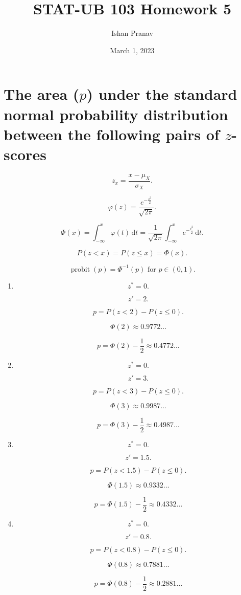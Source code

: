 \documentclass[12pt]{article}
\title{STAT-UB 103 Homework 5}
\author{Ishan Pranav}
\date{March 1, 2023}
\DeclareMathOperator{\probit}{probit}
\begin{document}
\maketitle
\section{The area ($p$) under the standard normal probability distribution between the following pairs of $z$-scores}
\[z_x=\frac{x-\mu_X}{\sigma_X}.\]

\[\varphi(z)=\frac{e^{-\frac{z^2}{2}}}{\sqrt{2\pi}}.\]

\[\Phi(x)=\int^x_{-\infty}{\varphi(t)\,\mathrm{d}t}=\frac{1}{\sqrt{2\pi}}\int^x_{-\infty}{e^{-\frac{t^2}{2}}\,\mathrm{d}t}.\]

\[P(z<x)=P(z\leq x)=\Phi(x).\]

\[\probit(p)=\Phi^{-1}(p)\text{ for } p\in(0,1).\]
\begin{enumerate}
\item
\[z^*=0.\]

\[z'=2.\]

\[p=P(z<2)-P(z\leq 0).\]

\[\Phi(2)\approx 0.9772\dots\]

\[p=\Phi(2)-\frac{1}{2}\approx 0.4772\dots\]
\item
\[z^*=0.\]

\[z'=3.\]

\[p=P(z<3)-P(z\leq 0).\]

\[\Phi(3)\approx 0.9987\dots\]

\[p=\Phi(3)-\frac{1}{2}\approx 0.4987\dots\]
\item
\[z^*=0.\]

\[z'=1.5.\]

\[p=P(z<1.5)-P(z\leq 0).\]

\[\Phi(1.5)\approx 0.9332\dots\]

\[p=\Phi(1.5)-\frac{1}{2}\approx 0.4332\dots\]
\item
\[z^*=0.\]

\[z'=0.8.\]

\[p=P(z<0.8)-P(z\leq 0).\]

\[\Phi(0.8)\approx 0.7881\dots\]

\[p=\Phi(0.8)-\frac{1}{2}\approx 0.2881\dots\]
\end{enumerate}
\end{document}
